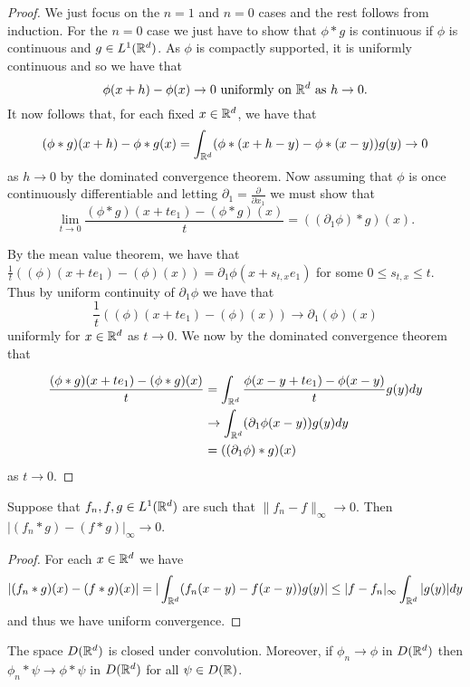 \documentclass[twoside, a4paper, 10pt]{amsart}
\begin{document}
\begin{proof} We just focus on the $n=1$ and $n=0$ cases and the rest follows from induction. For the $n=0$ case we just have to show that $\phi * g$ is continuous if $\phi$ is continuous and $g \in L^1(\mathbb{R}^d)$. As $\phi$ is compactly supported, it is uniformly continuous and so we have that $$\phi(x+h) - \phi(x) \to 0 \text{ uniformly on } \mathbb{R}^d \text{ as } h \to 0.$$ It now follows that, for each fixed $x \in \mathbb{R}^d$, we have that $$(\phi * g)(x+h) - \phi*g(x) = \int_{\mathbb{R}^d} (\phi*(x+h-y) - \phi*(x-y)) g(y) \to 0$$ as $h \to 0$ by the dominated convergence theorem. Now assuming that $\phi$ is once continuously differentiable and letting $\partial_1 = \frac{\partial}{\partial x_1}$ we must show that $$
\lim_{t \to 0} \frac{(\phi * g)(x+ te_1) - (\phi *g)(x)}{t} = ((\partial_1 \phi) * g)(x).$$

By the mean value theorem, we have that $\frac{1}{t}((\phi)(x+ te_1) - (\phi)(x) )= \partial_1 \phi (x + s_{t,x}e_1)$ for some $0 \leq s_{t,x} \leq t$. Thus by uniform continuity of $\partial_1 \phi$ we have that $$\frac{1}{t} ((\phi)(x+ te_1) - (\phi)(x)) \to \partial_1(\phi)(x) $$ uniformly for $x \in \mathbb{R}^d$ as $t \to 0$. We now by the dominated convergence theorem that

\begin{align*} \frac{(\phi * g)(x+ te_1) - (\phi *g)(x)}{t} &= \int_{\mathbb{R}^d} \frac{\phi(x-y+ te_1) - \phi(x-y)}{t} g(y) dy \\ &\to \int_{\mathbb{R}^d} (\partial_1\phi(x-y)) g(y) dy \\ &= ((\partial_1 \phi) * g)(x) \end{align*} as $t \to 0$. \end{proof}

\begin{prop} Suppose that $f_n,f,g \in L^1(\mathbb{R}^d)$ are such that $\| f_n -f\|_{\infty} \to 0$. Then $|(f_n *g) - (f*g)|_{\infty} \to 0$.

\end{prop}

\begin{proof}

For each $x \in \mathbb{R}^d$ we have $$|(f_n * g) (x) - (f*g)(x)| = |\int_{\mathbb{R}^d} (f_n(x-y) - f(x-y)) g(y)| \leq |f - f_n|_{\infty} \int_{\mathbb{R}^d} |g(y)| dy$$ and thus we have uniform convergence. \end{proof}

\begin{corol} The space $D(\mathbb{R}^d)$ is closed under convolution. Moreover, if $\phi_n \to \phi$ in $D(\mathbb{R}^d)$ then $\phi_n * \psi \to \phi * \psi$ in $D(\mathbb{R}^d)$ for all $\psi \in D(\mathbb{R})$.

\end{corol}
\end{document}
